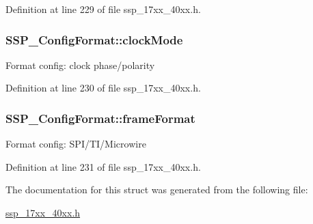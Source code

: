 Definition at line 229 of file ssp\+\_\+17xx\+\_\+40xx.\+h.

\subsubsection[{\texorpdfstring{clock\+Mode}{clockMode}}]{ S\+S\+P\+\_\+\+Config\+Format\+::clock\+Mode}\hypertarget{structSSP__ConfigFormat_a910e709c7d9e6e367a26028a939b69cf}{}\label{structSSP__ConfigFormat_a910e709c7d9e6e367a26028a939b69cf}
Format config\+: clock phase/polarity 

Definition at line 230 of file ssp\+\_\+17xx\+\_\+40xx.\+h.

\subsubsection[{\texorpdfstring{frame\+Format}{frameFormat}}]{ S\+S\+P\+\_\+\+Config\+Format\+::frame\+Format}\hypertarget{structSSP__ConfigFormat_ae702ac713d3aa81bffdf140ad8942ec7}{}\label{structSSP__ConfigFormat_ae702ac713d3aa81bffdf140ad8942ec7}
Format config\+: S\+P\+I/\+T\+I/\+Microwire 

Definition at line 231 of file ssp\+\_\+17xx\+\_\+40xx.\+h.



The documentation for this struct was generated from the following file\+:\begin{DoxyCompactItemize}
\item 
\hyperlink{ssp__17xx__40xx_8h}{ssp\+\_\+17xx\+\_\+40xx.\+h}\end{DoxyCompactItemize}

